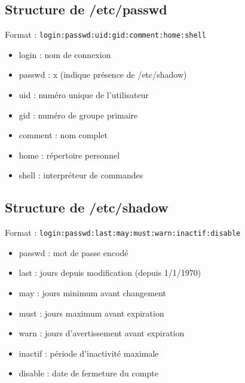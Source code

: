 \documentclass[12pt,a4paper]{article}
\begin{document}

\subsection{Structure de /etc/passwd}
Format : \texttt{login:passwd:uid:gid:comment:home:shell}
\begin{itemize}
    \item login : nom de connexion %
    \item passwd : x (indique pr\'esence de /etc/shadow) %
    \item uid : num\'ero unique de l'utilisateur %
    \item gid : num\'ero de groupe primaire %
    \item comment : nom complet %
    \item home : r\'epertoire personnel %
    \item shell : interpr\'eteur de commandes %
\end{itemize}


\subsection{Structure de /etc/shadow}
Format : \texttt{login:passwd:last:may:must:warn:inactif:disable}
\begin{itemize}
    \item passwd : mot de passe encod\'e %
    \item last : jours depuis modification (depuis 1/1/1970) %
    \item may : jours minimum avant changement %
    \item must : jours maximum avant expiration %
    \item warn : jours d'avertissement avant expiration %
    \item inactif : p\'eriode d'inactivit\'e maximale %
    \item disable : date de fermeture du compte %
\end{itemize}
\end{document}
